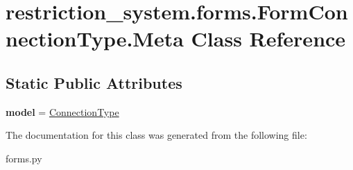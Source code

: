 \hypertarget{classrestriction__system_1_1forms_1_1FormConnectionType_1_1Meta}{}\section{restriction\+\_\+system.\+forms.\+Form\+Connection\+Type.\+Meta Class Reference}
\label{classrestriction__system_1_1forms_1_1FormConnectionType_1_1Meta}
\subsection*{Static Public Attributes}
\begin{DoxyCompactItemize}
\item 
\hypertarget{classrestriction__system_1_1forms_1_1FormConnectionType_1_1Meta_a8ab0d2e5b016287204870da75801177e}{}{\bfseries model} = \hyperlink{classrestriction__system_1_1models_1_1ConnectionType}{Connection\+Type}\label{classrestriction__system_1_1forms_1_1FormConnectionType_1_1Meta_a8ab0d2e5b016287204870da75801177e}

\end{DoxyCompactItemize}


The documentation for this class was generated from the following file\+:\begin{DoxyCompactItemize}
\item 
forms.\+py\end{DoxyCompactItemize}
